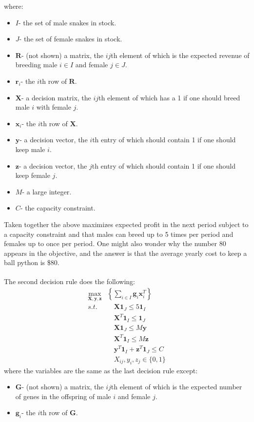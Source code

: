 \documentclass{article}
\begin{document}
	where:
	\begin{itemize}
	\item $I$- the set of male snakes in stock.
	\item $J$- the set of female snakes in stock.
	\item $\mathbf R$- (not shown) a matrix, the $ij$th element of which is the expected revenue of breeding male $i\in I$ and female $j\in J$.
	\item $\mathbf r_i$- the $i$th row of $\mathbf R$.
	\item $\mathbf X$- a decision matrix, the $ij$th element of which has a 1 if one should breed male $i$ with female $j$.
	\item $\mathbf x_i$- the $i$th row of $\mathbf X$.
	\item $\mathbf y$- a decision vector, the $i$th entry of which should contain 1 if one should keep male $i$.
	\item $\mathbf z$- a decision vector, the $j$th entry of which should contain 1 if one should keep female $j$.
	\item $M$- a large integer.
	\item $C$- the capacity constraint.
	\end{itemize}
	\indent Taken together the above maximizes expected profit in the next period subject to a capacity constraint and that males can breed up to 5 times per period and females up to once per period. One might also wonder why the number 80 appears in the objective, and the answer is that the average yearly cost to keep a ball python is \$80.\\
	\\\indent The second decision rule does the following:
	\begin{align*}
		\max_{\mathbf{X},\mathbf{y},\mathbf{z}}&\left\{ \sum_{i\in I}\mathbf g_i \mathbf x_i^T\right\}\\
      s.t. & \quad\mathbf X\mathbf 1_J \leq 5\mathbf 1_I \\
      &\quad \mathbf X^T \mathbf 1_I \leq \mathbf1_J\\
      &\quad \mathbf X \mathbf1_J\leq M\mathbf y\\
      & \quad\mathbf X^T\mathbf 1_I \leq M\mathbf z\\
      &\quad \mathbf y^T\mathbf 1_I + \mathbf z^T\mathbf 1_J \leq C\\
      & \quad X_{ij}, y_i, z_j \in \{0,1\}
	\end{align*}
	where the variables are the same as the last decision rule except:
	\begin{itemize}
	\item $\mathbf G$- (not shown) a matrix, the $ij$th element of which is the expected number of genes in the offspring of male $i$ and female $j$.
	\item $\mathbf g_i$- the $i$th row of $\mathbf G$.
	\end{itemize}
\end{document}
